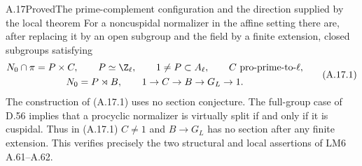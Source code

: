 \begin{statement}{A.17}{Proved}{The prime-complement configuration and the direction supplied by the local theorem}
For a noncuspidal normalizer in the affine setting there are,
after replacing it by an open subgroup and the field by a
finite extension, closed subgroups satisfying
\[
 \begin{gathered}
 N_0\cap\pi=P\times C,\qquad P\simeq\Z_\ell,
 \qquad 1\ne P\subset A_\ell,\qquad C\text{ pro-prime-to-}\ell,\\
 N_0=P\rtimes B,\qquad 1\to C\to B\to G_L\to1.
 \end{gathered}                                         \tag{A.17.1}
\]
The construction of (A.17.1) uses no section conjecture.
The full-group case of D.56 implies that a procyclic
normalizer is virtually split if and only if it is cuspidal.
Thus in (A.17.1) $C\ne1$ and $B\to G_L$ has no section
after any finite extension. This verifies precisely the two
structural and local assertions of LM6 A.61--A.62.
\end{statement}
